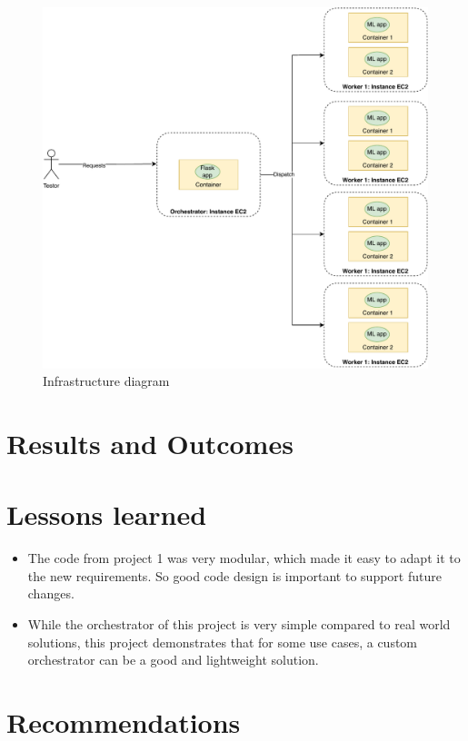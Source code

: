 \documentclass[letterpaper,headings=standardclasses,parskip=half]{scrartcl}
\newcommand{\todo}{{\color{red}{TODO}}}
\begin{document}
\begin{figure}
    \centering
    \includegraphics[width=\textwidth]{images/infra.pdf}
    \caption{Infrastructure diagram}
    \label{fig:infra}
\end{figure}


\section{Results and Outcomes}

\todo

\section{Lessons learned}

\begin{itemize}
    \item The code from project 1 was very modular, which made it easy to adapt it to the new requirements. So good code design is important to support future changes.
    \item While the orchestrator of this project is very simple compared to real world solutions, this project demonstrates that for some use cases, a custom orchestrator can be a good and lightweight solution.
\end{itemize}

\section{Recommendations}
\end{document}
